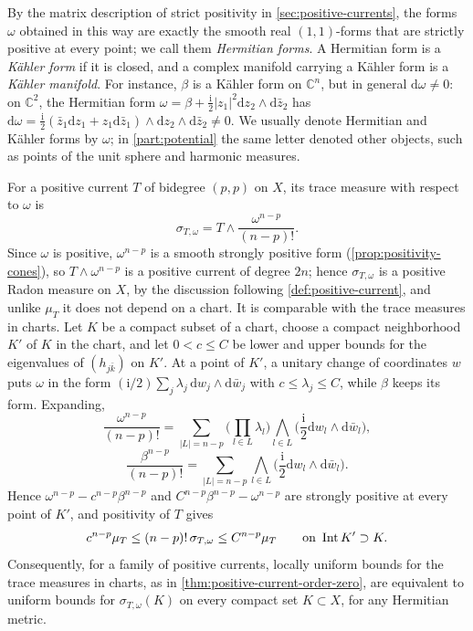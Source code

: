 By the matrix description of strict positivity in \cref{sec:positive-currents}, the forms $\omega$ obtained in this way are exactly the smooth real $(1,1)$-forms that are strictly positive at every point; we call them \emph{Hermitian forms}. A Hermitian form is a \emph{K\"ahler form} if it is closed, and a complex manifold carrying a K\"ahler form is a \emph{K\"ahler manifold}. For instance, $\beta$ is a K\"ahler form on $\mathbb C^n$, but in general $\mathrm d\omega\neq0$: on $\mathbb C^2$, the Hermitian form $\omega=\beta+\frac{\mathrm i}2|z_1|^2\mathrm dz_2\wedge\mathrm d\bar z_2$ has $\mathrm d\omega=\frac{\mathrm i}2(\bar z_1\mathrm dz_1+z_1\mathrm d\bar z_1)\wedge\mathrm dz_2\wedge\mathrm d\bar z_2\neq0$. We usually denote Hermitian and K\"ahler forms by $\omega$; in \cref{part:potential} the same letter denoted other objects, such as points of the unit sphere and harmonic measures.

For a positive current $T$ of bidegree $(p,p)$ on $X$, its trace measure with respect to $\omega$ is
\[
 \sigma_{T,\omega}=T\wedge\frac{\omega^{n-p}}{(n-p)!}.
\]
Since $\omega$ is positive, $\omega^{n-p}$ is a smooth strongly positive form (\cref{prop:positivity-cones}), so $T\wedge\omega^{n-p}$ is a positive current of degree $2n$; hence $\sigma_{T,\omega}$ is a positive Radon measure on $X$, by the discussion following \cref{def:positive-current}, and unlike $\mu_T$ it does not depend on a chart. It is comparable with the trace measures in charts. Let $K$ be a compact subset of a chart, choose a compact neighborhood $K'$ of $K$ in the chart, and let $0<c\leq C$ be lower and upper bounds for the eigenvalues of $(h_{j\bar k})$ on $K'$. At a point of $K'$, a unitary change of coordinates $w$ puts $\omega$ in the form $(\mathrm i/2)\sum_j\lambda_j\,\mathrm dw_j\wedge\mathrm d\bar w_j$ with $c\leq\lambda_j\leq C$, while $\beta$ keeps its form. Expanding,
\[
 \frac{\omega^{n-p}}{(n-p)!}=\sum_{|L|=n-p}\Big(\prod_{l\in L}\lambda_l\Big)\bigwedge_{l\in L}\Big(\frac{\mathrm i}2\mathrm dw_l\wedge\mathrm d\bar w_l\Big),
\]
\[
 \frac{\beta^{n-p}}{(n-p)!}=\sum_{|L|=n-p}\bigwedge_{l\in L}\Big(\frac{\mathrm i}2\mathrm dw_l\wedge\mathrm d\bar w_l\Big).
\]
Hence $\omega^{n-p}-c^{n-p}\beta^{n-p}$ and $C^{n-p}\beta^{n-p}-\omega^{n-p}$ are strongly positive at every point of $K'$, and positivity of $T$ gives
\[
 c^{n-p}\mu_T\leq(n-p)!\,\sigma_{T,\omega}\leq C^{n-p}\mu_T\qquad\text{on }\operatorname{Int} K'\supset K.
\]
Consequently, for a family of positive currents, locally uniform bounds for the trace measures in charts, as in \cref{thm:positive-current-order-zero}, are equivalent to uniform bounds for $\sigma_{T,\omega}(K)$ on every compact set $K\subset X$, for any Hermitian metric.

